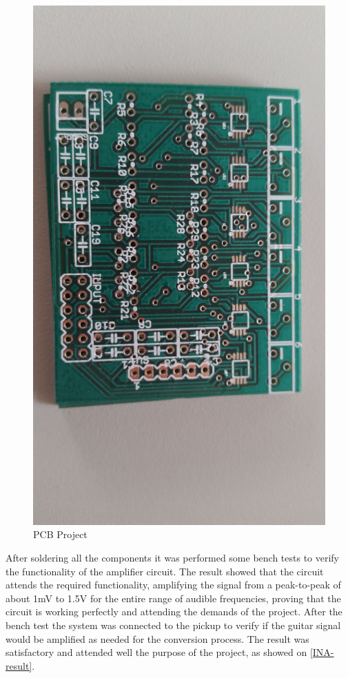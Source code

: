 \begin{figure}[!htpb]
  \centering
  \caption{PCB Project}
  \label{INA-printed}
  \includegraphics[scale=0.08]{images/INA/printed.jpeg}
\end{figure}
After soldering all the components it was performed some bench tests to verify the
functionality of the amplifier circuit. The result showed that the circuit attends
the required functionality, amplifying the signal from a peak-to-peak of about 1mV
to 1.5V for the entire range of audible frequencies, proving that the circuit is
working perfectly and attending the demands of the project. After the bench test
the system was connected to the pickup to verify if the guitar signal would be
amplified as needed for the conversion process. The result was satisfactory and
attended well the purpose of the project, as showed on \autoref{INA-result}.

